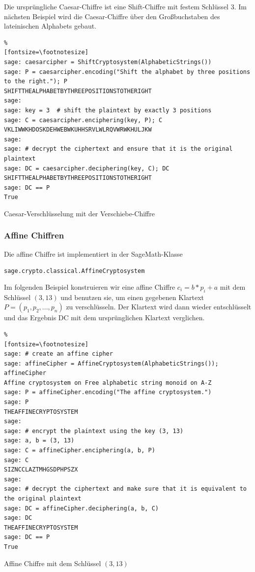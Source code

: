 \begin{refsegment}
Die ursprüngliche Caesar-Chiffre ist eine Shift-Chiffre mit
festem Schlüssel 3. Im nächsten Beispiel wird die Caesar-Chiffre
über den Großbuchstaben des lateinischen Alphabets gebaut.

\begin{sagecode}
\begin{Verbatim}%
[fontsize=\footnotesize]
sage: caesarcipher = ShiftCryptosystem(AlphabeticStrings())
sage: P = caesarcipher.encoding("Shift the alphabet by three positions to the right."); P
SHIFTTHEALPHABETBYTHREEPOSITIONSTOTHERIGHT
sage:
sage: key = 3  # shift the plaintext by exactly 3 positions
sage: C = caesarcipher.enciphering(key, P); C
VKLIWWKHDOSKDEHWEBWKUHHSRVLWLRQVWRWKHULJKW
sage:
sage: # decrypt the ciphertext and ensure that it is the original plaintext
sage: DC = caesarcipher.deciphering(key, C); DC
SHIFTTHEALPHABETBYTHREEPOSITIONSTOTHERIGHT
sage: DC == P
True
\end{Verbatim}
\caption{Caesar-Verschlüsselung mit der Verschiebe-Chiffre}
\label{paper_pencil:shift_cipher:Sage_example_Caesar_cipher}
\end{sagecode}


\newpage
\subsubsection{Affine Chiffren}
\label{PaP_affine_cipher_sage-sample}

Die affine Chiffre ist implementiert in der SageMath-Klasse
\begin{center}
\verb!sage.crypto.classical.AffineCryptosystem!
\end{center}

Im folgenden Beispiel konstruieren wir eine affine Chiffre $ c_i = b*p_i + a $
mit dem Schlüssel $(3, 13)$ und benutzen sie, um einen gegebenen Klartext
$P = (p_1,p_2, ...,p_n)$ zu verschlüsseln. Der Klartext wird dann wieder
entschlüsselt und das Ergebnis DC mit dem ursprünglichen Klartext verglichen.

\begin{sagecode}
\begin{Verbatim}%
[fontsize=\footnotesize]
sage: # create an affine cipher
sage: affineCipher = AffineCryptosystem(AlphabeticStrings()); affineCipher
Affine cryptosystem on Free alphabetic string monoid on A-Z
sage: P = affineCipher.encoding("The affine cryptosystem.")
sage: P
THEAFFINECRYPTOSYSTEM
sage:
sage: # encrypt the plaintext using the key (3, 13)
sage: a, b = (3, 13)
sage: C = affineCipher.enciphering(a, b, P)
sage: C
SIZNCCLAZTMHGSDPHPSZX
sage:
sage: # decrypt the ciphertext and make sure that it is equivalent to the original plaintext
sage: DC = affineCipher.deciphering(a, b, C)
sage: DC
THEAFFINECRYPTOSYSTEM
sage: DC == P
True
\end{Verbatim}
\caption{Affine Chiffre mit dem Schlüssel $(3, 13)$}
\end{sagecode}



\end{refsegment}
